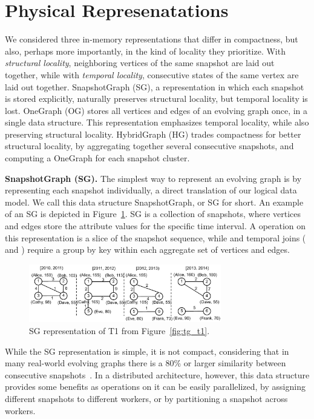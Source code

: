 \section{Physical Represenatations}
\label{sec:physical}

We considered three in-memory \tg representations that differ in
compactness, but also, perhaps more importantly, in the kind of
locality they prioritize. With {\em structural locality}, neighboring
vertices of the same snapshot are laid out together, while with {\em
  temporal locality}, consecutive states of the same vertex are laid
out together.  SnapshotGraph (SG), a representation in which each
snapshot is stored explicitly, naturally preserves structural
locality, but temporal locality is lost. OneGraph (OG) stores all
vertices and edges of an evolving graph once, in a single data
structure.  This representation emphasizes temporal locality, while
also preserving structural locality.  HybridGraph (HG) trades
compactness for better structural locality, by aggregating together
several consecutive snapshots, and computing a OneGraph for each
snapshot cluster.

{\bf SnapshotGraph (SG).} The simplest way to represent an evolving
graph is by representing each snapshot individually, a direct
translation of our logical data model.  We call this data structure
SnapshotGraph, or SG for short. An example of an SG is depicted in
Figure~\ref{fig:sgp}.  SG is a collection of snapshots, where vertices
and edges store the attribute values for the specific time interval.
A  operation on this representation is a slice of the
snapshot sequence, while  and temporal joins
( and ) require a group by key within each
aggregate set of vertices and edges.

\begin{figure}[t!]
\includegraphics[width=3.3in]{figs/sgp.pdf}
\caption{SG representation of T1 from Figure~\ref{fig:tg_t1}.}
\label{fig:sgp}
\end{figure}

While the SG representation is simple, it is not compact, considering
that in many real-world evolving graphs there is a 80\% or larger
similarity between consecutive
snapshots~\cite{DBLP:journals/tos/MiaoHLWYZPCC15}.  In a distributed
architecture, however, this data structure provides some benefits as
operations on it can be easily parallelized, by assigning different
snapshots to different workers, or by partitioning a snapshot across
workers.  

